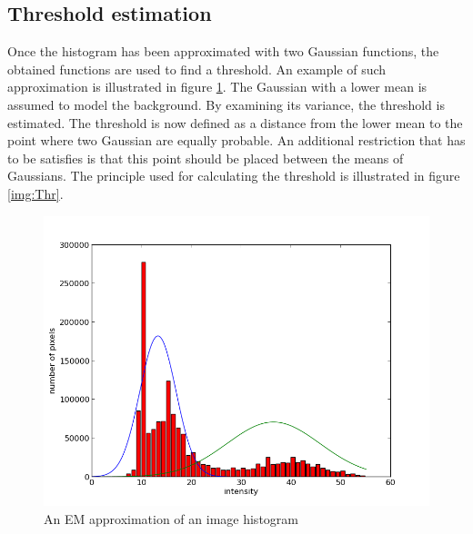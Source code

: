 
\subsection{Threshold estimation}

Once the histogram has been approximated with two Gaussian functions, the obtained functions are used to find a threshold. An example of such approximation is illustrated in figure \ref{img:Approx}. The Gaussian with a lower mean is assumed to model the background. By examining its variance, the threshold is estimated. The threshold is now defined as a distance from the lower mean to the point where two Gaussian are equally probable. An additional restriction that has to be satisfies is that this point should be placed between the means of Gaussians. The principle used for calculating the threshold is illustrated in figure \ref{img:Thr}. \\

\begin{figure}
	\begin{center}
		\includegraphics[scale=0.4]{Figures/segmentation/temp_hist_prez}
	\end{center}
	\label{img:Approx}
	\caption{An EM approximation of an image histogram}
\end{figure}

